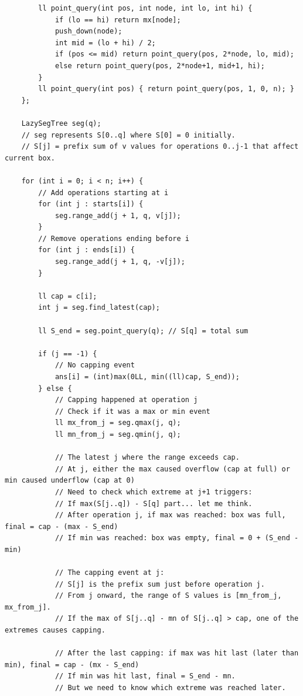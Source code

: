 \documentclass[11pt,a4paper]{article}
\begin{document}
\begin{lstlisting}
        ll point_query(int pos, int node, int lo, int hi) {
            if (lo == hi) return mx[node];
            push_down(node);
            int mid = (lo + hi) / 2;
            if (pos <= mid) return point_query(pos, 2*node, lo, mid);
            else return point_query(pos, 2*node+1, mid+1, hi);
        }
        ll point_query(int pos) { return point_query(pos, 1, 0, n); }
    };

    LazySegTree seg(q);
    // seg represents S[0..q] where S[0] = 0 initially.
    // S[j] = prefix sum of v values for operations 0..j-1 that affect current box.

    for (int i = 0; i < n; i++) {
        // Add operations starting at i
        for (int j : starts[i]) {
            seg.range_add(j + 1, q, v[j]);
        }
        // Remove operations ending before i
        for (int j : ends[i]) {
            seg.range_add(j + 1, q, -v[j]);
        }

        ll cap = c[i];
        int j = seg.find_latest(cap);

        ll S_end = seg.point_query(q); // S[q] = total sum

        if (j == -1) {
            // No capping event
            ans[i] = (int)max(0LL, min((ll)cap, S_end));
        } else {
            // Capping happened at operation j
            // Check if it was a max or min event
            ll mx_from_j = seg.qmax(j, q);
            ll mn_from_j = seg.qmin(j, q);

            // The latest j where the range exceeds cap.
            // At j, either the max caused overflow (cap at full) or min caused underflow (cap at 0)
            // Need to check which extreme at j+1 triggers:
            // If max(S[j..q]) - S[q] part... let me think.
            // After operation j, if max was reached: box was full, final = cap - (max - S_end)
            // If min was reached: box was empty, final = 0 + (S_end - min)

            // The capping event at j:
            // S[j] is the prefix sum just before operation j.
            // From j onward, the range of S values is [mn_from_j, mx_from_j].
            // If the max of S[j..q] - mn of S[j..q] > cap, one of the extremes causes capping.

            // After the last capping: if max was hit last (later than min), final = cap - (mx - S_end)
            // If min was hit last, final = S_end - mn.
            // But we need to know which extreme was reached later.


\end{lstlisting}
\end{document}
